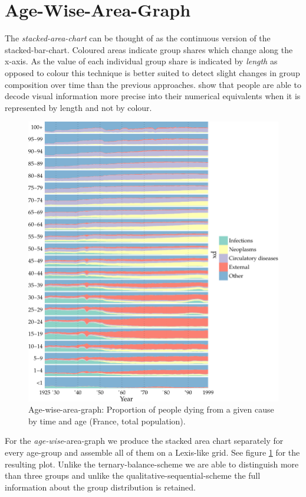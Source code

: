 \documentclass[a4paper]{scrartcl}
\begin{document}
\section*{Age-Wise-Area-Graph}

The \emph{stacked-area-chart} can be thought of as the continuous version of the stacked-bar-chart. Coloured areas indicate group shares which change along the x-axis. As the value of each individual group share is indicated by \emph{length} as opposed to colour this technique is better suited to detect slight changes in group composition over time than the previous approaches. \textcite{Cleveland1984} show that people are able to decode visual information more precise into their numerical equivalents when it is represented by length and not by colour.

\begin{figure}[htb!]
  \centering
  \includegraphics[width = 0.85\linewidth]{../fig/plot-agewise_area.pdf}
  \caption{Age-wise-area-graph: Proportion of people dying from a given cause by time and age (France, total population).}
  \label{fig:aag}
\end{figure}

For the \emph{age-wise}-area-graph we produce the stacked area chart separately for every age-group and assemble all of them on a Lexis-like grid. See figure \ref{fig:aag} for the resulting plot. Unlike the ternary-balance-scheme we are able to distinguish more than three groups and unlike the qualitative-sequential-scheme the full information about the group distribution is retained.
\end{document}
